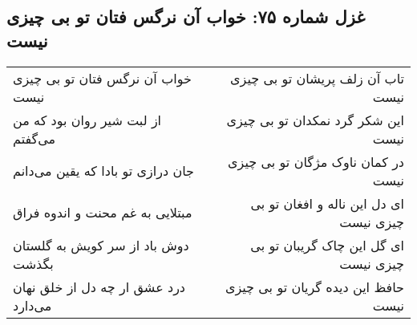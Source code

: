 \begin{center}
\section*{غزل شماره ۷۵: خواب آن نرگس فتان تو بی چیزی نیست}
\label{sec:sh075}
\begin{longtable}{l p{0.5cm} r}
خواب آن نرگس فتان تو بی چیزی نیست
&&
تاب آن زلف پریشان تو بی چیزی نیست
\\
از لبت شیر روان بود که من می‌گفتم
&&
این شکر گرد نمکدان تو بی چیزی نیست
\\
جان درازی تو بادا که یقین می‌دانم
&&
در کمان ناوک مژگان تو بی چیزی نیست
\\
مبتلایی به غم محنت و اندوه فراق
&&
ای دل این ناله و افغان تو بی چیزی نیست
\\
دوش باد از سر کویش به گلستان بگذشت
&&
ای گل این چاک گریبان تو بی چیزی نیست
\\
درد عشق ار چه دل از خلق نهان می‌دارد
&&
حافظ این دیده گریان تو بی چیزی نیست
\\
\end{longtable}
\end{center}
